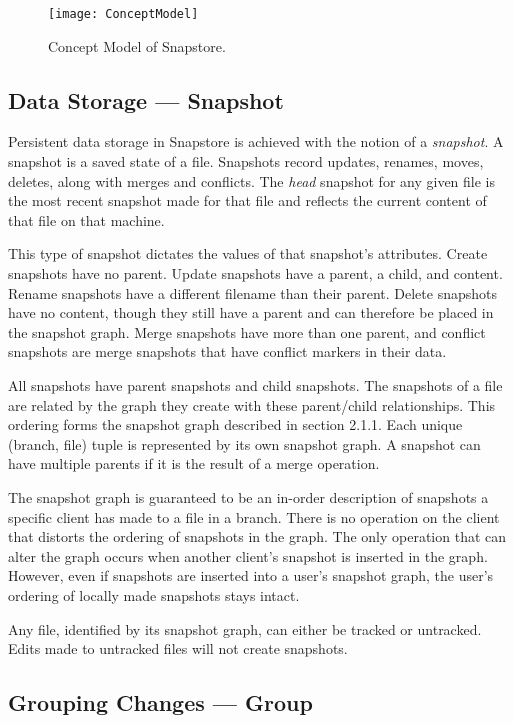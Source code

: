 \begin{figure}
\texttt{[image: ConceptModel]}
\caption{Concept Model of Snapstore.}
\label{arm:fig1}
\end{figure}

\subsection{Data Storage --- Snapshot}

Persistent data storage in Snapstore is achieved with the notion of a \textit{snapshot}. A snapshot is a saved state of a file. Snapshots record updates, renames, moves, deletes, along with merges and conflicts. The \textit{head} snapshot for any given file is the most recent snapshot made for that file and reflects the current content of that file on that machine. 

This type of snapshot dictates the values of that snapshot's attributes. Create snapshots have no parent. Update snapshots have a parent, a child, and content. Rename snapshots have a different filename than their parent. Delete snapshots have no content, though they still have a parent and can therefore be placed in the snapshot graph. Merge snapshots have more than one parent, and conflict snapshots are merge snapshots that have conflict markers in their data.

All snapshots have parent snapshots and child snapshots. The snapshots of a file are related by the graph they create with these parent/child relationships. This ordering forms the snapshot graph described in section 2.1.1. Each unique (branch, file) tuple is represented by its own snapshot graph. A snapshot can have multiple parents if it is the result of a merge operation. 

The snapshot graph is guaranteed to be an in-order description of snapshots a specific client has made to a file in a branch. There is no operation on the client that distorts the ordering of snapshots in the graph. The only operation that can alter the graph occurs when another client's snapshot is inserted in the graph. However, even if snapshots are inserted into a user's snapshot graph, the user's ordering of locally made snapshots stays intact.

Any file, identified by its snapshot graph, can either be tracked or untracked. Edits made to untracked files will not create snapshots.

\subsection{Grouping Changes --- Group}

